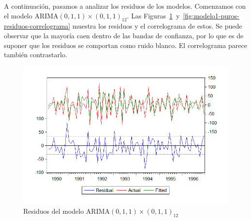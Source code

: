 \documentclass[12pt,a4paper,twoside,openright,titlepage,final]{article}
\begin{document}
A continuación, pasamos a analizar los residuos de los modelos. Comenzamos con el modelo ARIMA$(0,1,1)\times(0,1,1)_{12}$. Las Figuras~\ref{fig:modelo1-puros-residuos}~y~\ref{fig:modelo1-puros-residuos-correlograma} muestra los residuos y el correlograma de estos. Se puede observar que la mayoría caen dentro de las bandas de confianza, por lo que es de suponer que los residuos se comportan como ruido blanco. El correlograma parece también contrastarlo.\\

\begin{figure}[tbph!]
	\centering
	\includegraphics[width=0.8\linewidth]{imagenes/puros/modelo1-residuos.png}
	\caption{Residuos del modelo ARIMA$(0,1,1)\times(0,1,1)_{12}$}
	\label{fig:modelo1-puros-residuos}
\end{figure}
\end{document}
